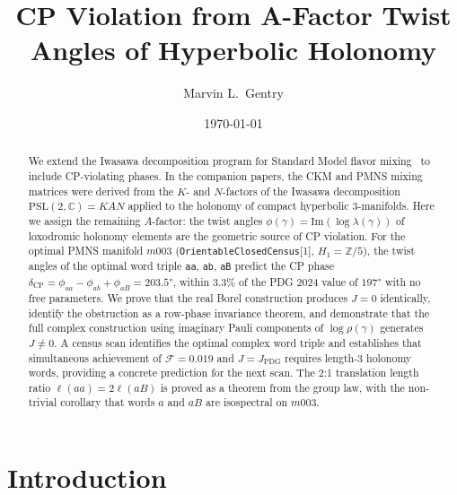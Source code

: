 \documentclass[floatfix,aps,prd,twocolumn,showpacs,superscriptaddress,longbibliography]{revtex4-2}
\newcommand{\PSL}{\mathrm{PSL}(2,\mathbb{C})}
\begin{document}
\title{CP Violation from A-Factor Twist Angles of Hyperbolic Holonomy}

\author{Marvin L.~Gentry}

\date{\today}

\begin{abstract}
We extend the Iwasawa decomposition program for Standard Model flavor
mixing~\cite{Gentry:CKM,Gentry:PMNS} to include CP-violating phases.
In the companion papers, the CKM and PMNS mixing matrices were derived
from the $K$- and $N$-factors of the Iwasawa decomposition
$\PSL = KAN$ applied to the holonomy of compact hyperbolic 3-manifolds.
Here we assign the remaining $A$-factor: the twist angles
$\phi(\gamma) = \mathrm{Im}(\log\lambda(\gamma))$ of loxodromic holonomy
elements are the geometric source of CP violation.
For the optimal PMNS manifold $m003$
(\texttt{OrientableClosedCensus}[1], $H_1 = \mathbb{Z}/5$),
the twist angles of the optimal word triple \texttt{aa}, \texttt{ab},
\texttt{aB} predict the CP phase
$\delta_{\mathrm{CP}} = \phi_{aa} - \phi_{ab} + \phi_{aB} = 203.5°$,
within $3.3\%$ of the PDG 2024 value of $197°$ with no free parameters.
We prove that the real Borel construction produces $J = 0$ identically,
identify the obstruction as a row-phase invariance theorem,
and demonstrate that the full complex construction using imaginary
Pauli components of $\log\rho(\gamma)$ generates $J \neq 0$.
A census scan identifies the optimal complex word triple and
establishes that simultaneous achievement of $\mathcal{F} = 0.019$
and $J = J_{\mathrm{PDG}}$ requires length-3 holonomy words,
providing a concrete prediction for the next scan.
The 2:1 translation length ratio $\ell(aa) = 2\ell(aB)$ is proved
as a theorem from the group law, with the non-trivial corollary
that words $a$ and $aB$ are isospectral on $m003$.
\end{abstract}


\maketitle

\section{Introduction}
\label{sec:intro}
\end{document}

